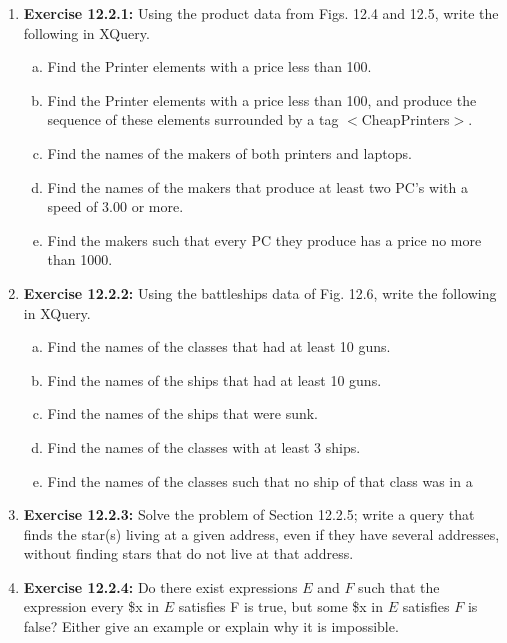 \documentclass[12pt]{article}
\begin{document}
\begin{enumerate}[1.]
    \item \textbf{Exercise 12.2.1:} Using the product data from Figs. 12.4 and 12.5, write the
    following in XQuery.

    \bigskip

    \begin{enumerate}[a)]
        \item Find the Printer elements with a price less than 100.
        \item Find the Printer elements with a price less than 100, and produce the sequence of these elements surrounded by a tag $<$CheapPrinters$>$.
        \item Find the names of the makers of both printers and laptops.
        \item Find the names of the makers that produce at least two PC's with a speed of 3.00 or more.
        \item Find the makers such that every PC they produce has a price no more than 1000.
    \end{enumerate}

    \item \textbf{Exercise 12.2.2:} Using the battleships data of Fig. 12.6, write the following
    in XQuery.

    \bigskip

    \begin{enumerate}[a)]
        \item Find the names of the classes that had at least 10 guns.
        \item Find the names of the ships that had at least 10 guns.
        \item Find the names of the ships that were sunk.
        \item Find the names of the classes with at least 3 ships.
        \item Find the names of the classes such that no ship of that class was in a
    \end{enumerate}


    \item \textbf{Exercise 12.2.3:} Solve the problem of Section 12.2.5; write a query that finds
    the star(s) living at a given address, even if they have several addresses, without
    finding stars that do not live at that address.

    \item \textbf{Exercise 12.2.4:} Do there exist expressions $E$ and $F$ such that the expression
    every \$x in $E$ satisfies F is true, but some \$x in $E$ satisfies $F$
    is false? Either give an example or explain why it is impossible.
\end{enumerate}
\end{document}
